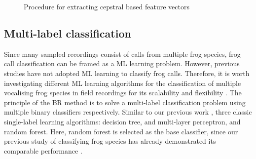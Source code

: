 \begin{figure}[htb!] %
\caption[Spectral clustering for cepstral feature extraction]{Procedure for extracting cepstral based feature vectors}
\label{fig:spectralClustering} 
\end{figure}





\subsection{Multi-label classification} 
Since many sampled recordings consist of calls from multiple frog species, frog call classification can be framed as a ML learning problem. However, previous studies have not adopted ML learning to classify frog calls. Therefore, it is worth investigating different ML learning algorithms for the classification of multiple vocalising frog species in field recordings for its scalability and flexibility \citep{read2011classifier}. The principle of the BR method is to solve a multi-label classification problem using multiple binary classifiers respectively. Similar to our previous work \citep{zhang2016using}, 
three classic single-label learning algorithms: decision tree, and multi-layer perceptron, and random forest. Here, random forest is selected as the base classifier, since our previous study of classifying frog species has already demonstrated its comparable performance \citep{xie2016acoustic}. 


